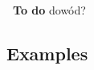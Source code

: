 \documentclass[a4paper, 12pt]{article}
\newcommand{\smalltodo}[1]{\textbf{\ To do}}
\begin{document}
\smalltodo\\ dowód?
\subsection{Examples}
\end{document}
